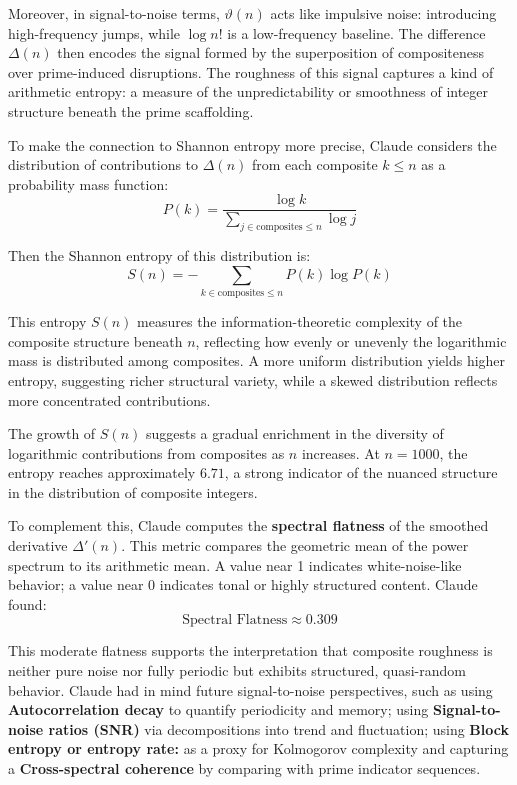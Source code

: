 Moreover, in signal-to-noise terms, $\vartheta(n)$ acts like impulsive noise: introducing high-frequency jumps, while $\log n!$ is a low-frequency baseline. The difference $\Delta(n)$ then encodes the signal formed by the superposition of compositeness over prime-induced disruptions. The roughness of this signal captures a kind of arithmetic entropy: a measure of the unpredictability or smoothness of integer structure beneath the prime scaffolding.

To make the connection to Shannon entropy more precise, Claude considers the distribution of contributions to $\Delta(n)$ from each composite $k \leq n$ as a probability mass function:
\begin{equation}
P(k) = \frac{\log k}{\sum_{j \in \text{composites} \leq n} \log j}
\end{equation}

Then the Shannon entropy of this distribution is:
\begin{equation}
S(n) = - \sum_{k \in \text{composites} \leq n} P(k) \log P(k)
\end{equation}

This entropy $S(n)$ measures the information-theoretic complexity of the composite structure beneath $n$, reflecting how evenly or unevenly the logarithmic mass is distributed among composites. A more uniform distribution yields higher entropy, suggesting richer structural variety, while a skewed distribution reflects more concentrated contributions.

The growth of $S(n)$ suggests a gradual enrichment in the diversity of logarithmic contributions from composites as $n$ increases. At $n=1000$, the entropy reaches approximately $6.71$, a strong indicator of the nuanced structure in the distribution of composite integers.

To complement this, Claude computes the \textbf{spectral flatness} of the smoothed derivative $\Delta'(n)$. This metric compares the geometric mean of the power spectrum to its arithmetic mean. A value near 1 indicates white-noise-like behavior; a value near 0 indicates tonal or highly structured content. Claude found:
\begin{equation*}
\text{Spectral Flatness} \approx 0.309
\end{equation*}

This moderate flatness supports the interpretation that composite roughness is neither pure noise nor fully periodic but exhibits structured, quasi-random behavior. Claude had in mind future signal-to-noise perspectives, such as using \textbf{Autocorrelation decay} to quantify periodicity and memory; using 
\textbf{Signal-to-noise ratios (SNR)} via decompositions into trend and fluctuation; using \textbf{Block entropy or entropy rate:}  as a proxy for Kolmogorov complexity and capturing a \textbf{Cross-spectral coherence} by comparing with prime indicator sequences.

